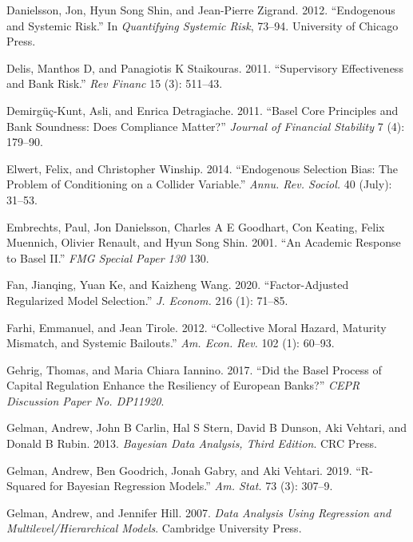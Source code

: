 \documentclass[
  10pt,
]{article}
\begin{document}
\leavevmode\hypertarget{ref-Danielsson2012}{}%
Danielsson, Jon, Hyun Song Shin, and Jean-Pierre Zigrand. 2012.
``Endogenous and Systemic Risk.'' In \emph{Quantifying Systemic Risk},
73--94. University of Chicago Press.

\leavevmode\hypertarget{ref-Delis2011}{}%
Delis, Manthos D, and Panagiotis K Staikouras. 2011. ``Supervisory
Effectiveness and Bank Risk.'' \emph{Rev Financ} 15 (3): 511--43.

\leavevmode\hypertarget{ref-Demirguc-Kunt2011}{}%
Demirgüç-Kunt, Asli, and Enrica Detragiache. 2011. ``Basel Core
Principles and Bank Soundness: Does Compliance Matter?'' \emph{Journal
of Financial Stability} 7 (4): 179--90.

\leavevmode\hypertarget{ref-Elwert2014}{}%
Elwert, Felix, and Christopher Winship. 2014. ``Endogenous Selection
Bias: The Problem of Conditioning on a Collider Variable.'' \emph{Annu.
Rev. Sociol.} 40 (July): 31--53.

\leavevmode\hypertarget{ref-Embrechts2001}{}%
Embrechts, Paul, Jon Danielsson, Charles A E Goodhart, Con Keating,
Felix Muennich, Olivier Renault, and Hyun Song Shin. 2001. ``An Academic
Response to Basel II.'' \emph{FMG Special Paper 130} 130.

\leavevmode\hypertarget{ref-Fan2020}{}%
Fan, Jianqing, Yuan Ke, and Kaizheng Wang. 2020. ``Factor-Adjusted
Regularized Model Selection.'' \emph{J. Econom.} 216 (1): 71--85.

\leavevmode\hypertarget{ref-Farhi2012}{}%
Farhi, Emmanuel, and Jean Tirole. 2012. ``Collective Moral Hazard,
Maturity Mismatch, and Systemic Bailouts.'' \emph{Am. Econ. Rev.} 102
(1): 60--93.

\leavevmode\hypertarget{ref-Gehrig2017}{}%
Gehrig, Thomas, and Maria Chiara Iannino. 2017. ``Did the Basel Process
of Capital Regulation Enhance the Resiliency of European Banks?''
\emph{CEPR Discussion Paper No. DP11920}.

\leavevmode\hypertarget{ref-Gelman2013}{}%
Gelman, Andrew, John B Carlin, Hal S Stern, David B Dunson, Aki Vehtari,
and Donald B Rubin. 2013. \emph{Bayesian Data Analysis, Third Edition}.
CRC Press.

\leavevmode\hypertarget{ref-Gelman2019}{}%
Gelman, Andrew, Ben Goodrich, Jonah Gabry, and Aki Vehtari. 2019.
``R-Squared for Bayesian Regression Models.'' \emph{Am. Stat.} 73 (3):
307--9.

\leavevmode\hypertarget{ref-Gelman2007}{}%
Gelman, Andrew, and Jennifer Hill. 2007. \emph{Data Analysis Using
Regression and Multilevel/Hierarchical Models}. Cambridge University
Press.
\end{document}
